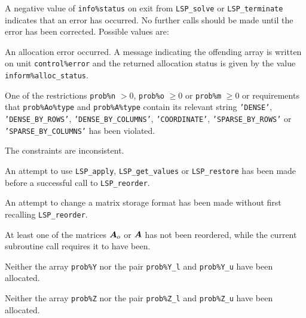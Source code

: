 \documentclass{galahad}
\newcommand{\packagename}{LSP}
\begin{document}
\galerrors
A negative value of {\tt info\%status} on exit from 
{\tt \packagename\_solve}
or 
{\tt \packagename\_terminate}
indicates that an error has occurred. No further calls should be made
until the error has been corrected. Possible values are:

\begin{description}

 An allocation error occurred. 
A message indicating the offending 
 array is written on unit {\tt control\%error} and the returned allocation 
 status is given by the value {\tt inform\%alloc\_status}.

 One of the restrictions 
{\tt prob\%n} $> 0$, {\tt prob\%o} $\geq  0$ or {\tt prob\%m} $\geq  0$
    or requirements that {\tt prob\%Ao\%type} 
    and {\tt prob\%A\%type} contain its relevant string
    {\tt 'DENSE'}, {\tt 'DENSE\_BY\_ROWS'}, {\tt 'DENSE\_BY\_COLUMNS'}, 
   {\tt 'COORDINATE'}, {\tt 'SPARSE\_BY\_ROWS'} or {\tt 'SPARSE\_BY\_COLUMNS'} 
    has been violated.


 The constraints are inconsistent.

 An attempt to use 
{\tt \packagename\_apply}, {\tt \packagename\_get\_values} 
or {\tt \packagename\_restore} 
has been made before a successful call to {\tt \packagename\_reorder}. 
 
 An attempt to change a matrix storage format has been made 
without first recalling {\tt \packagename\_reorder}. 
 
 At least one of the matrices ${\bm{A}}_o$ or ${\bm{A}}$ has not been reordered,
while the current subroutine call requires it to have been. 

 Neither the array {\tt prob\%Y} nor the pair {\tt prob\%Y\_l} and
{\tt prob\%Y\_u} have been allocated.

 Neither the array {\tt prob\%Z} nor the pair {\tt prob\%Z\_l} and
{\tt prob\%Z\_u} have been allocated.

\end{description}

\end{document}
